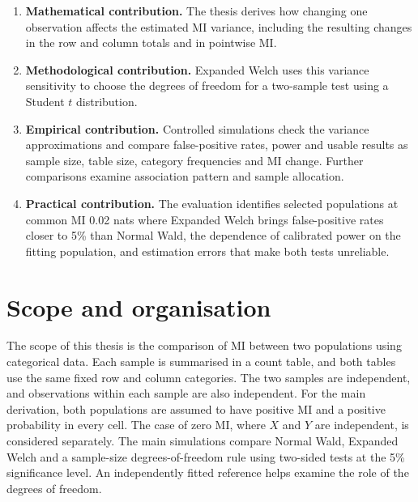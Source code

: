 \begin{enumerate}
  \item \begin{samepage}\textbf{Mathematical contribution.} The thesis derives how changing
  one observation affects the estimated MI variance, including the resulting
  changes in the row and column totals and in pointwise MI.
  \par
  \end{samepage}

  \item \begin{samepage}\textbf{Methodological contribution.} Expanded Welch uses this
  variance sensitivity to choose the degrees of freedom for a two-sample
  test using a Student \(t\) distribution.
  \par
  \end{samepage}

  \item \begin{samepage}\textbf{Empirical contribution.} Controlled simulations check
  the variance approximations and compare false-positive rates, power and
  usable results as sample size, table size, category frequencies and MI
  change. Further comparisons examine association pattern and sample
  allocation.
  \par
  \end{samepage}

  \item \textbf{Practical contribution.} The evaluation identifies
  selected populations at common MI 0.02 nats where Expanded Welch brings
  false-positive rates closer to 5\% than Normal Wald, the dependence of calibrated power on
  the fitting population, and estimation errors that make both tests
  unreliable.
\end{enumerate}

\section{Scope and organisation}

The scope of this thesis is the comparison of MI between two populations
using categorical data. Each sample is summarised in a count table, and
both tables use the same fixed row and column categories. The two samples
are independent, and observations within each sample are also independent.
For the main derivation, both populations are assumed to have positive MI
and a positive probability in every cell. The case of zero MI, where
\(X\) and \(Y\) are independent, is considered separately.
The main simulations compare Normal Wald, Expanded Welch and a sample-size
degrees-of-freedom rule using two-sided tests at the 5\% significance level.
An independently fitted reference helps examine the role of the degrees
of freedom.

